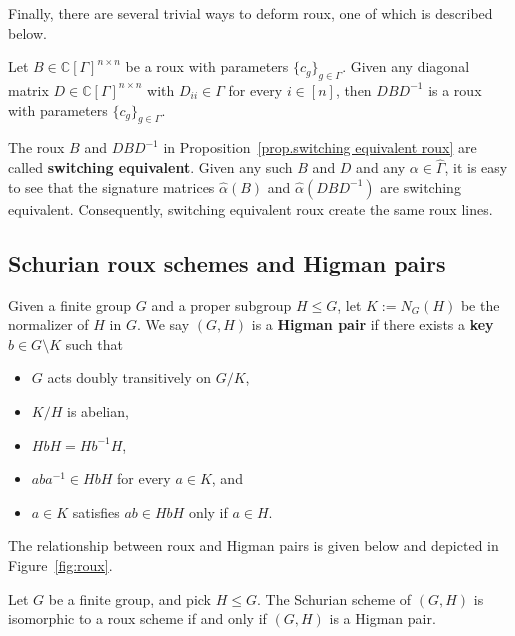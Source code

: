 Finally, there are several trivial ways to deform roux, one of which is described below.

\begin{proposition}
\label{prop.switching equivalent roux}
Let $B \in \mathbb{C}[\Gamma]^{n\times n}$ be a roux with parameters $\{c_g \}_{g \in \Gamma}$.
Given any diagonal matrix $D \in \mathbb{C}[\Gamma]^{n\times n}$ with $D_{ii} \in \Gamma$ for every $i \in [n]$, then $DBD^{-1}$ is a roux with parameters $\{c_g\}_{g\in \Gamma}$.
\end{proposition}

The roux $B$ and $DBD^{-1}$ in Proposition~\ref{prop.switching equivalent roux} are called \textbf{switching equivalent}.
Given any such $B$ and $D$ and any $\alpha \in \widehat{\Gamma}$, it is easy to see that the signature matrices $\hat{\alpha}(B)$ and $\hat{\alpha}(DBD^{-1})$ are switching equivalent.
Consequently, switching equivalent roux create the same roux lines.

\subsection{Schurian roux schemes and Higman pairs}

\begin{definition}
Given a finite group $G$ and a proper subgroup $H\leq G$, let $K:=N_G(H)$ be the normalizer of $H$ in $G$.
We say $(G,H)$ is a \textbf{Higman pair} if there exists a \textbf{key} $b\in G\setminus K$ such that
\begin{itemize}
\item[(H1)]
$G$ acts doubly transitively on $G/K$,
\item[(H2)]
$K/H$ is abelian,
\item[(H3)]
$HbH=Hb^{-1}H$,
\item[(H4)]
$aba^{-1}\in HbH$ for every $a\in K$, and
\item[(H5)]
$a \in K$ satisfies $ab \in HbH$ only if $a \in H$.
\end{itemize}
\end{definition}

The relationship between roux and Higman pairs is given below and depicted in Figure~\ref{fig:roux}.

\begin{proposition}
\label{prop.schurian roux}
Let $G$ be a finite group, and pick $H\leq G$.
The Schurian scheme of $(G,H)$ is isomorphic to a roux scheme if and only if $(G,H)$ is a Higman pair.
\end{proposition}

